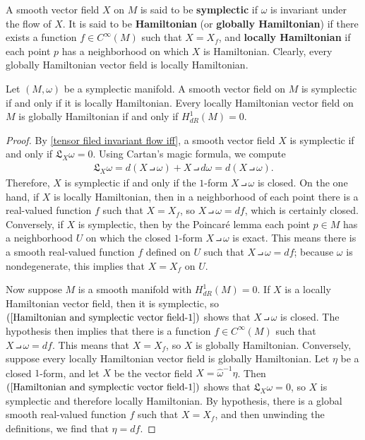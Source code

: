 A smooth vector field $X$ on $M$ is said to be \textbf{symplectic} if $\omega$ is invariant under the flow of $X$. It is said to be \textbf{Hamiltonian} (or \textbf{globally Hamiltonian}) if there exists a function $f\in C^\infty(M)$ such that $X=X_f$, and \textbf{locally Hamiltonian} if each point $p$ has a neighborhood on which $X$ is Hamiltonian. Clearly, every globally Hamiltonian vector field is locally Hamiltonian.

\begin{proposition}\label{Hamiltonian and symplectic vector field}
Let $(M,\omega)$ be a symplectic manifold. A smooth vector field on $M$ is symplectic if and only if it is locally Hamiltonian. Every locally Hamiltonian vector field on $M$ is globally Hamiltonian if and only if $H^1_{dR}(M)=0$.
\end{proposition}
\begin{proof}
By \cref{tensor filed invariant flow iff}, a smooth vector field $X$ is symplectic if and only if $\mathfrak{L}_X\omega=0$. Using Cartan's magic formula, we compute
\begin{align}\label{Hamiltonian and symplectic vector field-1}
\mathfrak{L}_X\omega=d(X\intprod\omega)+X\intprod d\omega=d(X\intprod\omega).
\end{align}
Therefore, $X$ is symplectic if and only if the $1$-form $X\intprod\omega$ is closed. On the one hand, if $X$ is locally Hamiltonian, then in a neighborhood of each point there is a real-valued function $f$ such that $X=X_f$, so $X\intprod\omega=df$, which is certainly closed. Conversely, if $X$ is symplectic, then by the Poincar\'e lemma each point $p\in M$ has a neighborhood $U$ on which the closed $1$-form $X\intprod\omega$ is exact. This means there is a smooth real-valued function $f$ defined on $U$ such that $X\intprod\omega=df$; because $\omega$ is nondegenerate, this implies that $X=X_f$ on $U$.\par
Now suppose $M$ is a smooth manifold with $H^1_{dR}(M)=0$. If $X$ is a locally Hamiltonian vector field, then it is symplectic, so $(\ref{Hamiltonian and symplectic vector field-1})$ shows that $X\intprod\omega$ is closed. The hypothesis then implies that there is a function $f\in C^\infty(M)$ such that $X\intprod\omega=df$. This means that $X=X_f$, so $X$ is globally Hamiltonian. Conversely, suppose every locally Hamiltonian vector field is globally Hamiltonian. Let $\eta$ be a closed $1$-form, and let $X$ be the vector field $X=\widehat{\omega}^{-1}\eta$. Then $(\ref{Hamiltonian and symplectic vector field-1})$ shows that $\mathfrak{L}_X\omega=0$, so $X$ is symplectic and therefore locally Hamiltonian. By hypothesis, there is a global smooth real-valued function $f$ such that $X=X_f$, and then unwinding the definitions, we find that $\eta=df$.
\end{proof}


